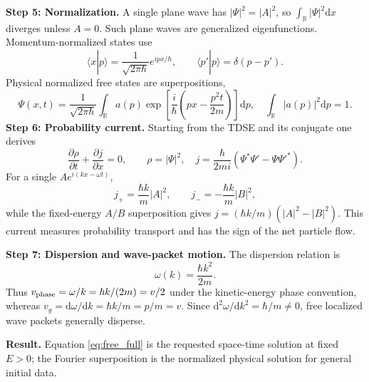 \documentclass[11pt,a4paper]{article}
\newcommand{\dd}{\mathrm{d}}
\newcommand{\R}{\mathbb R}
\begin{document}
\par\textbf{Step 5: Normalization.} A single plane wave has $|\Psi|^2=|A|^2$, so $\int_{\R}|\Psi|^2\dd x$ diverges unless $A=0$. Such plane waves are generalized eigenfunctions. Momentum-normalized states use
\begin{equation}
\langle x|p\rangle=\frac1{\sqrt{2\pi\hbar}}e^{ipx/\hbar},\qquad
\langle p'|p\rangle=\delta(p-p').
\end{equation}
Physical normalized free states are superpositions,
\begin{equation}
\boxed{\Psi(x,t)=\frac1{\sqrt{2\pi\hbar}}\int_{\R} a(p)
\exp\left[\frac i\hbar\left(px-\frac{p^2t}{2m}\right)\right]\dd p},
\quad\int_{\R}|a(p)|^2\dd p=1.
\end{equation}
\textbf{Step 6: Probability current.} Starting from the TDSE and its conjugate one derives
\begin{equation}
\frac{\partial\rho}{\partial t}+\frac{\partial j}{\partial x}=0,\qquad
\rho=|\Psi|^2,\quad j=\frac\hbar{2mi}(\Psi^*\Psi'-\Psi\Psi'^*).
\end{equation}
For a single $Ae^{i(kx-\omega t)}$,
\begin{equation}
\boxed{j_+=\frac{\hbar k}{m}|A|^2},\qquad
\boxed{j_-=-\frac{\hbar k}{m}|B|^2},
\end{equation}
while the fixed-energy $A/B$ superposition gives $j=(\hbar k/m)(|A|^2-|B|^2)$. This current measures probability transport and has the sign of the net particle flow.
\par\textbf{Step 7: Dispersion and wave-packet motion.} The dispersion relation is
\begin{equation}
\boxed{\omega(k)=\frac{\hbar k^2}{2m}}.
\end{equation}
Thus $v_{\rm phase}=\omega/k=\hbar k/(2m)=v/2$ under the kinetic-energy phase convention, whereas $v_g=\dd\omega/\dd k=\hbar k/m=p/m=v$. Since $\dd^2\omega/\dd k^2=\hbar/m\ne0$, free localized wave packets generally disperse.\par
\textbf{Result.} Equation \eqref{eq:free_full} is the requested space-time solution at fixed $E>0$; the Fourier superposition is the normalized physical solution for general initial data.
\end{document}
